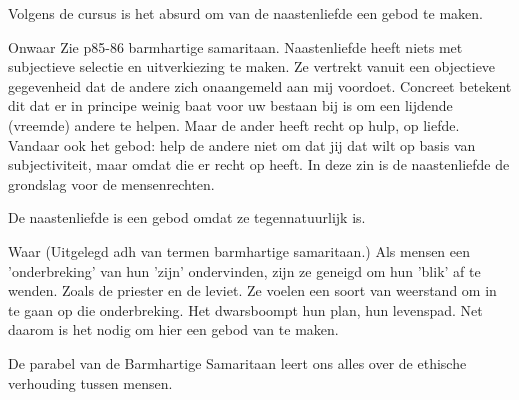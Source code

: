 \documentclass[main.tex]{subfiles}
\begin{document}
\begin{examenvraag}
    \begin{stelling}
        Volgens de cursus is het absurd om van de naastenliefde een gebod te maken.
    \end{stelling}

    \begin{stelling-antwoord}{Onwaar}
        Zie p85-86 barmhartige samaritaan.
        Naastenliefde heeft niets met subjectieve selectie en uitverkiezing te maken.
        Ze vertrekt vanuit een objectieve gegevenheid dat de andere zich onaangemeld aan mij voordoet.
        Concreet betekent dit dat er in principe weinig baat voor uw bestaan bij is om een lijdende (vreemde) andere te helpen. 
        Maar de ander heeft recht op hulp, op liefde. 
        Vandaar ook het gebod: help de andere niet om dat jij dat wilt op basis van subjectiviteit, maar omdat die er recht op heeft.
        In deze zin is de naastenliefde de grondslag voor de mensenrechten.
    \end{stelling-antwoord}
\end{examenvraag}


\begin{examenvraag}
    \begin{stelling}
        De naastenliefde is een gebod omdat ze tegennatuurlijk is.
    \end{stelling}


    \begin{stelling-antwoord}{Waar}
        (Uitgelegd adh van termen barmhartige samaritaan.)
        Als mensen een 'onderbreking' van hun 'zijn' ondervinden, zijn ze geneigd om hun 'blik'
        af te wenden. 
        Zoals de priester en de leviet.
        Ze voelen een soort van weerstand om in te gaan op die onderbreking.
        Het dwarsboompt hun plan, hun levenspad.
        Net daarom is het nodig om hier een gebod van te maken.
    \end{stelling-antwoord}
\end{examenvraag}


\begin{examenvraag}
    \begin{stelling}
        De parabel van de Barmhartige Samaritaan leert ons alles over de ethische verhouding tussen mensen.
    \end{stelling}

    \begin{antwoord}
    \end{antwoord}
\end{examenvraag}
\end{document}
